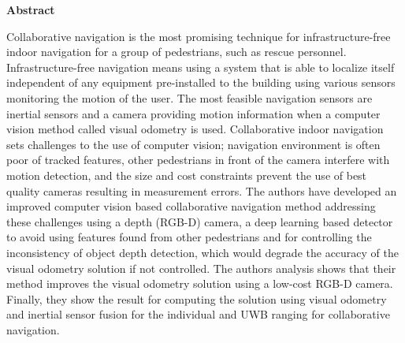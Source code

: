 \newpage
\thispagestyle{empty}
\begin{center}
  \vspace*{1cm}
  \textbf{\large Abstract}
\end{center}
Collaborative navigation is the most promising technique for infrastructure-free indoor navigation for a group of pedestrians, such as rescue personnel. Infrastructure-free navigation means using a system that is able to localize itself independent of any equipment pre-installed to the building using various sensors monitoring the motion of the user. The most feasible navigation sensors are inertial sensors and a camera providing motion information when a computer vision method called visual odometry is used. Collaborative indoor navigation sets challenges to the use of computer vision; navigation environment is often poor of tracked features, other pedestrians in front of the camera interfere with motion detection, and the size and cost constraints prevent the use
of best quality cameras resulting in measurement errors. The authors have developed an improved computer vision based collaborative navigation method addressing these challenges using a depth (RGB-D) camera, a deep learning based
detector to avoid using features found from other pedestrians and for controlling the inconsistency of object depth detection, which would degrade the accuracy of the visual odometry solution if not controlled. The authors analysis shows that their method improves the visual odometry solution using a low-cost RGB-D camera. Finally, they show the result for computing the solution using visual odometry and inertial sensor fusion for the individual and UWB ranging for collaborative navigation.





